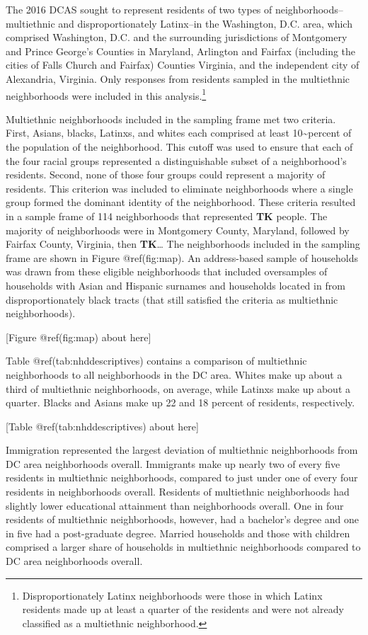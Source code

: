 \documentclass{baderart}
\begin{document}
The 2016 DCAS sought to represent residents of two types of neighborhoods--multiethnic and disproportionately Latinx--in the Washington, D.C. area, which comprised Washington, D.C. and the surrounding jurisdictions of Montgomery and Prince George's Counties in Maryland, Arlington and Fairfax (including the cities of Falls Church and Fairfax) Counties Virginia, and the independent city of Alexandria, Virginia. Only responses from residents sampled in the multiethnic neighborhoods were included in this analysis.\footnote{Disproportionately   Latinx neighborhoods were those in which Latinx residents made up at   least a quarter of the residents and were not already classified as a   multiethnic neighborhood.}

Multiethnic neighborhoods included in the sampling frame met two criteria. First, Asians, blacks, Latinxs, and whites each comprised at least 10\textasciitilde{}percent of the population of the neighborhood. This cutoff was used to ensure that each of the four racial groups represented a distinguishable subset of a neighborhood's residents. Second, none of those four groups could represent a majority of residents. This criterion was included to eliminate neighborhoods where a single group formed the dominant identity of the neighborhood. These criteria resulted in a sample frame of 114 neighborhoods that represented \textbf{TK} people. The majority of neighborhoods were in Montgomery County, Maryland, followed by Fairfax County, Virginia, then \textbf{TK}\ldots{} The neighborhoods included in the sampling frame are shown in Figure @ref(fig:map). An address-based sample of households was drawn from these eligible neighborhoods that included oversamples of households with Asian and Hispanic surnames and households located in from disproportionately black tracts (that still satisfied the criteria as multiethnic neighborhoods).

{[}Figure @ref(fig:map) about here{]}

Table @ref(tab:nhddescriptives) contains a comparison of multiethnic neighborhoods to all neighborhoods in the DC area. Whites make up about a third of multiethnic neighborhoods, on average, while Latinxs make up about a quarter. Blacks and Asians make up 22 and 18 percent of residents, respectively.

{[}Table @ref(tab:nhddescriptives) about here{]}

Immigration represented the largest deviation of multiethnic neighborhoods from DC area neighborhoods overall. Immigrants make up nearly two of every five residents in multiethnic neighborhoods, compared to just under one of every four residents in neighborhoods overall. Residents of multiethnic neighborhoods had slightly lower educational attainment than neighborhoods overall. One in four residents of multiethnic neighborhoods, however, had a bachelor's degree and one in five had a post-graduate degree. Married households and those with children comprised a larger share of households in multiethnic neighborhoods compared to DC area neighborhoods overall.
\end{document}
